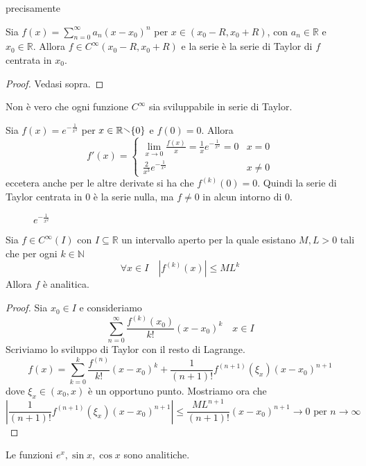 precisamente
\begin{theorem}
    Sia \(\displaystyle f(x) = \sum_{n=0}^{\infty} a_{n} {(x-x_{0})}^{n} \) per
    \(x \in (x_{0} -R, x_{0} + R)\), con \(a_{n} \in \mathbb{R}\) e \(x_{0} \in
    \mathbb{R}\). Allora \(f \in C^{\infty}(x_{0}-R, x_{0}+R)\) e la serie è la
    serie di Taylor di \(f\) centrata in \(x_{0}\).
\end{theorem}
\begin{proof}
    Vedasi sopra.
\end{proof}
Non è vero che ogni funzione \(C^{\infty}\) sia sviluppabile in serie di Taylor.
\begin{example}
    Sia \(f(x) = e^{-\frac{1}{x^2}}\) per \(x \in \mathbb{R} \sminus \{0\} \) e \(f(0)
    = 0\). Allora 
    \[
        f'(x) = \begin{cases}
            \lim_{x \to 0} \frac{f(x)}{x} = \frac{1}{x} e^{-\frac{1}{x^2}} = 0  & x = 0 \\
            \frac{2}{x^3} e^{-\frac{1}{x^2}} & x \neq 0
        \end{cases}
    \]
    eccetera anche per le altre derivate si ha che \(f^{(k)}(0) = 0\). Quindi la
    serie di Taylor centrata in \(0\) è la serie nulla, ma \(f \neq 0\) in alcun
    intorno di \(0\).
    \begin{figure}[ht]
        \centering
        \caption{\(\displaystyle e^{-\frac{1}{x^2}}\)}
    \end{figure}
\end{example}
\begin{theorem}
    Sia \(f \in C^{\infty}(I)\) con \(I \subseteq \mathbb{R} \) un intervallo
    aperto per la quale esistano \(M, L > 0\) tali che per ogni \(k \in \mathbb{N}\) 
    \[
        \forall  x \in I \quad |f^{(k)}(x)| \le M L^{k}
    \]
    Allora \(f\) è analitica.
\end{theorem}
\begin{proof}
    Sia \(x_{0} \in I\) e consideriamo
    \[
        \sum_{n=0}^{\infty} \frac{f^{(k)} (x_{0})}{k!} {(x - x_{0})}^{k} \quad x
        \in I
    \]
    Scriviamo lo sviluppo di Taylor con il resto di Lagrange.
    \[
        f(x) = \sum_{k=0}^{k} \frac{f^{(n)}}{k!}  
        {(x - x_{0})}^{k} + \frac{1}{(n+1)!} f^{(n+1)}(\xi_x) {(x - x_{0})}^{n+1}
    \]
    dove \(\xi_x \in (x_{0}, x)\) è un opportuno punto.
    Mostriamo ora che  
    \[
        \left| \frac{1}{(n+1)!} f^{(n+1)}(\xi_x) {(x - x_{0})}^{n+1} \right| \le
    \frac{M L^{n+1}}{(n+1)!} {(x - x_{0})}^{n+1} \to 0 \text{ per } n \to
    \infty
    \]
\end{proof}
\begin{example}
    Le funzioni \(e^{x}, \sin x, \cos x\) sono analitiche.
\end{example}

